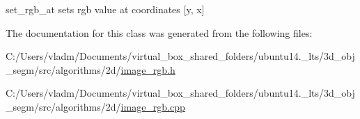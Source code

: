 set\+\_\+rgb\+\_\+at sets rgb value at coordinates \mbox{[}y, x\mbox{]} 



The documentation for this class was generated from the following files\+:\begin{DoxyCompactItemize}
\item 
C\+:/\+Users/vladm/\+Documents/virtual\+\_\+box\+\_\+shared\+\_\+folders/ubuntu14.\+\_\+lts/3d\+\_\+obj\+\_\+segm/src/algorithms/2d/\hyperlink{image__rgb_8h}{image\+\_\+rgb.\+h}\item 
C\+:/\+Users/vladm/\+Documents/virtual\+\_\+box\+\_\+shared\+\_\+folders/ubuntu14.\+\_\+lts/3d\+\_\+obj\+\_\+segm/src/algorithms/2d/\hyperlink{image__rgb_8cpp}{image\+\_\+rgb.\+cpp}\end{DoxyCompactItemize}
